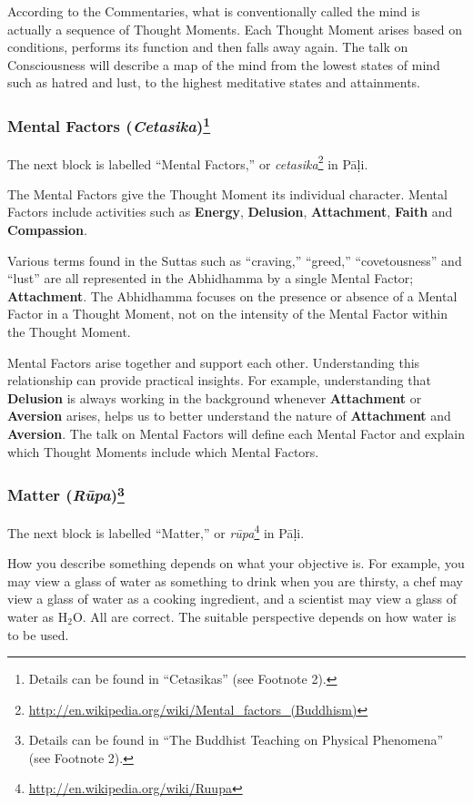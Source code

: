 According to the Commentaries, what is conventionally called the mind is actually a sequence of Thought Moments. Each Thought Moment arises based on conditions, performs its function and then falls away again. The talk on Consciousness will describe a map of the mind from the lowest states of mind such as hatred and lust, to the highest meditative states and attainments.

\subsubsection*{Mental Factors (\textit{Cetasika})\footnote{Details can be found in “Cetasikas” (see Footnote 2).}}

The next block is labelled “Mental Factors,” or \textit{cetasika}\footnote{\url{http://en.wikipedia.org/wiki/Mental_factors_(Buddhism)}} in Pāḷi.

The Mental Factors give the Thought Moment its individual character. Mental Factors include activities such as \textbf{Energy}, \textbf{Delusion}, \textbf{Attachment}, \textbf{Faith} and \textbf{Compassion}. 

Various terms found in the Suttas such as “craving,” “greed,” “covetousness” and “lust” are all represented in the Abhidhamma by a single Mental Factor; \textbf{Attachment}. The Abhidhamma focuses on the presence or absence of a Mental Factor in a Thought Moment, not on the intensity of the Mental Factor within the Thought Moment.

Mental Factors arise together and support each other. Understanding this relationship can provide practical insights. For example, understanding that \textbf{Delusion} is always working in the background whenever \textbf{Attachment} or \textbf{Aversion} arises, helps us to better understand the nature of \textbf{Attachment} and \textbf{Aversion}. The talk on Mental Factors will define each Mental Factor and explain which Thought Moments include which Mental Factors.

\subsubsection*{Matter (\textit{Rūpa})\footnote{Details can be found in “The Buddhist Teaching on Physical Phenomena” (see Footnote 2).}}

The next block is labelled “Matter,” or \textit{rūpa}\footnote{\url{http://en.wikipedia.org/wiki/Ruupa}} in Pāḷi.

How you describe something depends on what your objective is. For example, you may view a glass of water as something to drink when you are thirsty, a chef may view a glass of water as a cooking ingredient, and a scientist may view a glass of water as H$_{2}$O. All are correct. The suitable perspective depends on how water is to be used.

